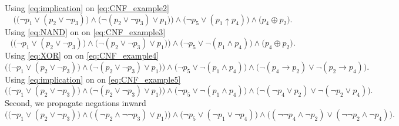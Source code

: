 Using \autoref{eq:implication} on \autoref{eq:CNF_example2}
\begin{equation}\label{eq:CNF_example3}
    \bigg(
        \Big(
            \neg p_1 \vee (
                p_2 \vee \neg p_3
            )
        \Big) \wedge \Big(
                \neg (
                    p_2 \vee \neg p_3 
                ) \vee p_1 
            \Big)
    \bigg) \wedge \Big(
        \neg p_5 \vee (
            p_1 \uparrow p_4
        )
    \Big) \wedge \Big(
        p_4 \oplus p_2
    \Big).
\end{equation}
Using \autoref{eq:NAND} on on \autoref{eq:CNF_example3}
\begin{equation}\label{eq:CNF_example4}
    \bigg(
        \Big(
            \neg p_1 \vee (
                p_2 \vee \neg p_3
            )
        \Big) \wedge \Big(
                \neg (
                    p_2 \vee \neg p_3 
                ) \vee p_1 
            \Big)
    \bigg) \wedge \Big(
        \neg p_5 \vee \neg (
            p_1 \wedge p_4
        )
    \Big) \wedge \Big(
        p_4 \oplus p_2
    \Big).
\end{equation}
Using \autoref{eq:XOR} on on \autoref{eq:CNF_example4}
\begin{equation}\label{eq:CNF_example5}
    \bigg(
        \Big(
            \neg p_1 \vee (
                p_2 \vee \neg p_3
            )
        \Big) \wedge \Big(
                \neg (
                    p_2 \vee \neg p_3 
                ) \vee p_1 
            \Big)
    \bigg) \wedge \Big(
        \neg p_5 \vee \neg (
            p_1 \wedge p_4
        )
    \Big) \wedge \Big(
        \neg (
            p_4 \rightarrow p_2
        ) \vee \neg (
            p_2 \rightarrow p_4
        )
    \Big).
\end{equation}
Using \autoref{eq:implication} on on \autoref{eq:CNF_example5}
\begin{equation}\label{eq:CNF_example6}
    \bigg(
        \Big(
            \neg p_1 \vee (
                p_2 \vee \neg p_3
            )
        \Big) \wedge \Big(
                \neg (
                    p_2 \vee \neg p_3 
                ) \vee p_1 
            \Big)
    \bigg) \wedge \Big(
        \neg p_5 \vee \neg (
            p_1 \wedge p_4
        )
    \Big) \wedge \Big(
        \neg (
            \neg p_4 \vee p_2
        ) \vee \neg (
            \neg p_2 \vee p_4
        )
    \Big).
\end{equation}
Second, we propagate negations inward
\begin{equation*}
    \bigg(
        \Big(
            \neg p_1 \vee (
                p_2 \vee \neg p_3
            )
        \Big) \wedge \Big(
                (
                    \neg p_2 \wedge \neg \neg p_3 
                ) \vee p_1 
            \Big)
    \bigg) \wedge \Big(
        \neg p_5 \vee (
            \neg p_1 \vee \neg p_4
        )
    \Big) \wedge \Big(
        (
            \neg \neg p_4 \wedge \neg p_2
        ) \vee (
            \neg \neg p_2 \wedge \neg p_4
        )
    \Big).
\end{equation*}
